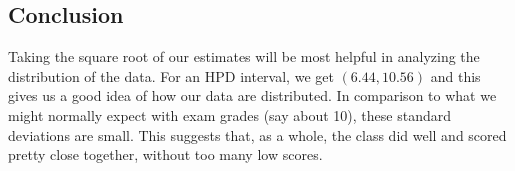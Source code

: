 \documentclass[12pt]{article}
\begin{document}
\subsection{Conclusion}

Taking the square root of our estimates will be most helpful in analyzing the distribution of the data.  For an HPD interval, we get $(6.44, 10.56)$ and this gives us a good idea of how our data are distributed.  In comparison to what we might normally expect with exam grades (say about 10), these standard deviations are small.  This suggests that, as a whole, the class did well and scored pretty close together, without too many low scores.

% 
% 
% 
% 
% 
% 
% 
% 
% 
% 
% 
% 
% 
\end{document}
